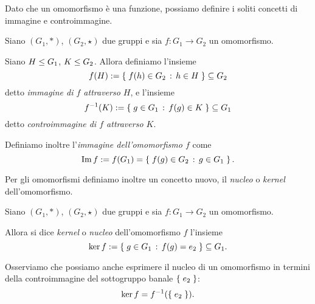 Dato che un omomorfismo è una funzione, possiamo definire i soliti concetti di immagine e controimmagine.

\begin{definition}
     \label{def:omo_imm_controimm}
    Siano $(G_1, *)$, $(G_2, \star)$ due gruppi e sia $f : G_1 \to G_2$ un omomorfismo.

    Siano $H \leq G_1$, $K \leq G_2$. Allora definiamo l'insieme \[
        f(H) := \left\{\;f(h) \in G_2 \,:\, h \in H\;\right\} \subseteq G_2    
    \] detto \emph{immagine di $f$ attraverso $H$}, e l'insieme \[
        f^{-1}(K) := \left\{\;g \in G_1 \,:\, f(g) \in K\;\right\} \subseteq G_1
    \] detto \emph{controimmagine di $f$ attraverso $K$}.

    Definiamo inoltre l'\emph{immagine dell'omomorfismo $f$} come \[
        \operatorname{Im} f := f(G_1) = \left\{\;f(g) \in G_2 \,:\, g \in G_1\;\right\}.     
    \]
\end{definition}

Per gli omomorfismi definiamo inoltre un concetto nuovo, il \emph{nucleo} o \emph{kernel} dell'omomorfismo.

\begin{definition}
     \label{def:kernel_omo}
    Siano $(G_1, *)$, $(G_2, \star)$ due gruppi e sia $f : G_1 \to G_2$ un omomorfismo.

    Allora si dice \emph{kernel} o \emph{nucleo} dell'omomorfismo $f$ l'insieme \[
        \ker f := \left\{\;g \in G_1 \,:\, f(g) = e_2\;\right\} \subseteq G_1.    
    \]
\end{definition}

Osserviamo che possiamo anche esprimere il nucleo di un omomorfismo in termini della controimmagine del sottogruppo banale $\left\{\;e_2\;\right\}$: \[
    \ker f = f^{-1}(\left\{\;e_2\;\right\}).
\]

